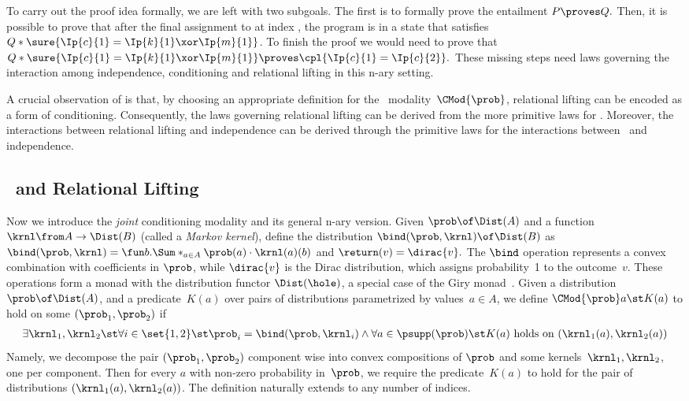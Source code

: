 \documentclass[acmsmall,nonacm,screen,appendix]{acmart}
\begin{document}
To carry out the proof idea formally, we are left with two subgoals.
The first is to formally prove the entailment
$
  P \proves Q.
$
Then, it is possible to prove that after
the final assignment to  at index ,
the program is in a state that satisfies
$Q * \sure{\Ip{c}{1} = \Ip{k}{1} \xor \Ip{m}{1}}$.
To finish the proof we would need to prove that
$
  Q * \sure{\Ip{c}{1} = \Ip{k}{1} \xor \Ip{m}{1}}
  \proves
  \cpl{ \Ip{c}{1} = \Ip{c}{2} }.
$
These missing steps need laws
governing the interaction among independence, conditioning and relational lifting in this \pre n-ary setting.

\begin{result}
A crucial observation of \thelogic{}
is that, by choosing an appropriate definition for the
\supercond\ modality~$\CMod{\prob}$,
relational lifting can be encoded as a form of conditioning.
Consequently, the laws governing relational lifting can be derived
from the more primitive laws for \supercond.
Moreover, the interactions between relational lifting and independence can be derived through the primitive laws for the interactions between \supercond\ and independence.
\end{result}





\subsection{\SuperCond\ and Relational Lifting}
\label{sec:overview:supercond}

Now we introduce the \emph{joint} conditioning modality and its general \pre n-ary version.
Given
$\prob \of \Dist(A)$ and
a function $\krnl \from A \to \Dist(B)$ (called a \emph{Markov kernel}),
define the distribution $\bind(\prob, \krnl) \of \Dist(B)$ as
$
  \bind(\prob, \krnl) =
    \fun b.\Sum*_{a\in A} \prob(a) \cdot \krnl(a)(b)
$ and $
  \return(v) = \dirac{v}.
$
The $\bind$ operation represents a convex combination with coefficients in
$\prob$, while $\dirac{v}$ is the Dirac distribution, which assigns probability~1
to the outcome~$v$.
These operations form a monad with the distribution functor $\Dist(\hole)$,
a special case of the Giry monad~\cite{giry1982categorical}.
Given a distribution $\prob \of \Dist(A)$,
and a predicate~$K(a)$ over pairs of distributions
parametrized by values~$a\in A$,
we define
$
  \CMod{\prob} a\st K(a)
$
to hold on some $(\prob_1,\prob_2)$ if
\begin{align*}
  \exists \krnl_1,\krnl_2 \st
  \forall i \in \set{1,2} \st
    \prob_i = \bind(\prob, \krnl_i)
  \land
  \forall a \in \psupp(\prob) \st
    K(a) \text{ holds on }
    (\krnl_1(a), \krnl_2(a))
\end{align*}
Namely, we decompose the pair $(\prob_1,\prob_2)$ component wise
into convex compositions of $\prob$ and some kernels~$\krnl_1,\krnl_2$,
one per component.
Then for every $a$ with non-zero probability in~$\prob$, we require the predicate~$K(a)$ to hold for the pair of distributions
$ (\krnl_1(a), \krnl_2(a)) $.
The definition naturally extends to any number of indices.
\end{document}
